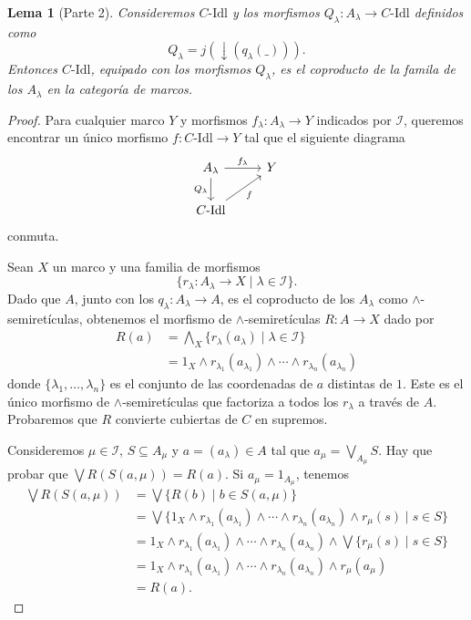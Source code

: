 \documentclass[12pt,letterpaper,titlepage]{article}
\newtheorem{lemma}{Lema}
\theoremstyle{definition}
\newcommand\Sup{\bigvee}
\newcommand\down{{\downarrow}}
\renewcommand\inf{\wedge}
\newcommand\Inf{\bigwedge}
\newcommand\scr[1]{\mathscr{#1}}
\newcommand\<{\langle}
\renewcommand\>{\rangle}
\newcommand\Idl{\text{-}\mathrm{Idl}}
\begin{document}
\begin{lemma}[Parte 2]
    Consideremos $C\Idl$ y los morfismos
    $Q_\lambda\colon A_\lambda\to C\Idl$
    definidos como
    \[
        Q_\lambda=j(\down(q_\lambda(\_)))
    .\]
    Entonces $C\Idl$, equipado con los morfismos $Q_\lambda$,
    es el coproducto de la famila de los $A_\lambda$
    en la categoría de marcos.
\end{lemma}
\begin{proof}
Para cualquier marco $Y$ y morfismos
$f_\lambda\colon A_\lambda\to Y$ indicados por $\scr I$,
queremos encontrar un único morfismo
$f\colon C\Idl\to Y$ tal que el siguiente diagrama
\[
    \begin{tikzcd}
        A_\lambda
            \ar[d,"Q_\lambda"']
            \ar[r,"f_\lambda"]
        & Y \\
        C\Idl \ar[ru,"f"']
    \end{tikzcd}
\]
conmuta.

Sean $X$ un marco y una familia de morfismos
\[\{r_\lambda\colon A_\lambda\to X\mid \lambda\in \scr I\}.\]
Dado que $A$, junto con los $q_\lambda:A_\lambda\to A$,
es el coproducto de los $A_\lambda$ como $\inf$-semiretículas,
obtenemos el morfismo de $\inf$-semiretículas
$R\colon A\to X$ dado por
\begin{align*}
    R(a)
    &=\Inf_X \{r_\lambda(a_\lambda)\mid \lambda\in\scr I\} \\
    &= 1_X\inf r_{\lambda_1}(a_{\lambda_1})\inf\cdots\inf r_{\lambda_n}(a_{\lambda_n})
\end{align*}
donde $\{\lambda_1,\dots,\lambda_n\}$ es el conjunto
de las coordenadas de $a$ distintas de $1$.
Este es el único morfismo de $\inf$-semiretículas que
factoriza a todos los $r_\lambda$ a través de $A$.
Probaremos que $R$ convierte cubiertas de $C$ en supremos.

Consideremos $\mu\in\scr I$, $S\subseteq A_\mu$ y $a=(a_\lambda)\in A$ tal que $a_\mu=\Sup_{A_\mu} S$.
Hay que probar que $\Sup R(S(a,\mu)) = R(a)$.
Si $a_\mu= 1_{A_\mu}$, tenemos
\begin{align*}
    \Sup R(S(a,\mu))
    &= \Sup\{R(b) \mid b\in S(a,\mu)\} \\
    &= \Sup\{ 1_X\inf r_{\lambda_1}(a_{\lambda_1})\inf
        \cdots\inf r_{\lambda_n}(a_{\lambda_n}) \inf r_\mu(s) \mid s\in S\} \\
    &= 1_X\inf r_{\lambda_1}(a_{\lambda_1})\inf
        \cdots\inf r_{\lambda_n}(a_{\lambda_n}) \inf
        \Sup\{ r_\mu(s) \mid s\in S\} \\
    &= 1_X\inf r_{\lambda_1}(a_{\lambda_1})\inf
        \cdots\inf r_{\lambda_n}(a_{\lambda_n}) \inf
        r_\mu(a_\mu) \\
    &= R(a).
\end{align*}


\end{proof}
\end{document}
